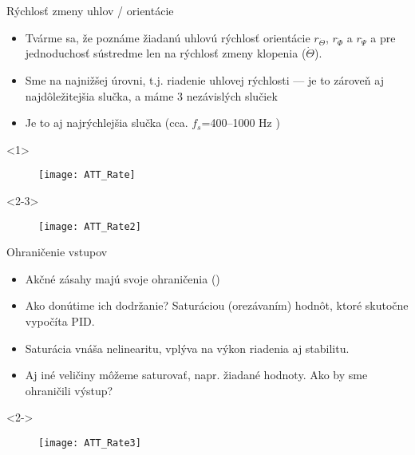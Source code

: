 \begin{frame}[t]{Rýchlosť zmeny uhlov / orientácie}
\begin{itemize}
  \item<1-> Tvárme sa, že poznáme žiadanú uhlovú rýchlosť orientácie $r_{\dot{\Theta}}$, $r_{\dot{\Phi}}$ a $r_{\dot{\Psi}}$ a pre jednoduchosť sústredme len na rýchlosť zmeny klopenia ($\dot{\Theta}$).
  \item<2-> Sme na najnižšej úrovni, t.j. riadenie uhlovej rýchlosti  --- je to zároveň aj najdôležitejšia slučka, a máme 3 nezávislých slučiek \citep{AP:PID,PX4:PIDTuning}
  \item<3->  Je to aj najrýchlejšia slučka (cca. $f_s$=400--1000 Hz \citep{AP:PID,PX4:PIDTuning})
  \end{itemize}

  \begin{onlyenv}<1>
  \begin{figure}
\centering
  \texttt{[image: ATT\_Rate]}\\
\end{figure}
\end{onlyenv}

  \begin{onlyenv}<2-3>
  \begin{figure}
\centering
  \texttt{[image: ATT\_Rate2]}\\
\end{figure}
\end{onlyenv}

  \end{frame}

\begin{frame}[t]{Ohraničenie vstupov}
  \begin{itemize}
    \item<1-> Akčné zásahy majú svoje ohraničenia ()
    \item<2-> Ako donútime ich dodržanie? Saturáciou (orezávaním) hodnôt, ktoré skutočne vypočíta PID.
    \item<3-> Saturácia vnáša nelinearitu, vplýva na výkon riadenia aj stabilitu.
    \item<4-> Aj iné veličiny môžeme saturovať, napr. žiadané hodnoty. Ako by sme ohraničili výstup?
  \end{itemize}

    \begin{onlyenv}<2->
  \begin{figure}
\centering
  \texttt{[image: ATT\_Rate3]}\\
\end{figure}
\end{onlyenv}
\end{frame}


